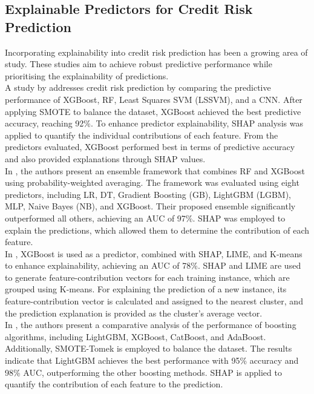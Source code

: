 \subsection{Explainable Predictors for Credit Risk Prediction}

    Incorporating explainability into credit risk prediction has been a growing area of study. These studies aim to achieve robust predictive performance while prioritising the explainability of predictions.\\

    A study by \cite{zhou2025enhancing} addresses credit risk prediction by comparing the predictive performance of XGBoost, RF, Least Squares SVM (LSSVM), and a CNN. After applying SMOTE to balance the dataset, XGBoost achieved the best predictive accuracy, reaching 92\%. To enhance predictor explainability, SHAP analysis was applied to quantify the individual contributions of each feature. From the predictors evaluated, XGBoost performed best in terms of predictive accuracy and also provided explanations through SHAP values.\\ 

    In \cite{baisholan2025fraudx}, the authors present an ensemble framework that combines RF and XGBoost using probability-weighted averaging. The framework was evaluated using eight predictors, including LR, DT, Gradient Boosting (GB), LightGBM (LGBM), MLP, Naive Bayes (NB), and XGBoost. Their proposed ensemble significantly outperformed all others, achieving an AUC of 97\%. SHAP was employed to explain the predictions, which allowed them to determine the contribution of each feature.\\

   In \cite{sun2025enhancing}, XGBoost is used as a predictor, combined with SHAP, LIME, and K-means to enhance explainability, achieving an AUC of 78\%. SHAP and LIME are used to generate feature-contribution vectors for each training instance, which are grouped using K-means. For explaining the prediction of a new instance, its feature-contribution vector is calculated and assigned to the nearest cluster, and the prediction explanation is provided as the cluster’s average vector.\\

    In \cite{nguyen2025comparative}, the authors present a comparative analysis of the performance of boosting algorithms, including LightGBM, XGBoost, CatBoost, and AdaBoost. Additionally, SMOTE-Tomek \cite{batista2003balancing} is employed to balance the dataset. The results indicate that LightGBM achieves the best performance with 95\%  accuracy and 98\% AUC, outperforming the other boosting methods. SHAP is applied to quantify the contribution of each feature to the prediction.\\

